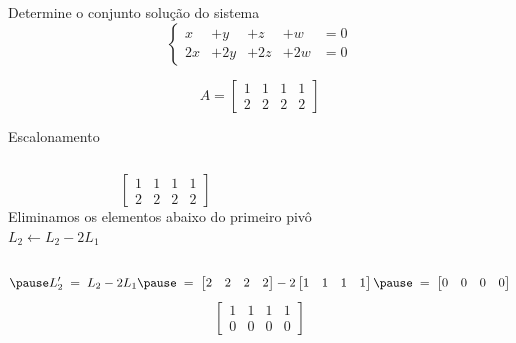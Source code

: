 \begin{question}
  Determine o conjunto solução do sistema
  \[
    \left\{\begin{array}{rrrrr}
       x & +  y & +  z & +  w & = 0 \\
      2x & + 2y & + 2z & + 2w & = 0
    \end{array}\right.
  \]

  \bigskip
  \[
    A =
    \begin{bmatrix}
      1 & 1 & 1 & 1 \\
      2 & 2 & 2 & 2
    \end{bmatrix}
  \]
\end{question}

\begin{resolution}{Escalonamento}
  \begin{columns}
    \[\;\;\;
      \begin{bmatrix}
        1 & 1 & 1 & 1 \\
        2 & 2 & 2 & 2
      \end{bmatrix}
    \]
    \pause
    Eliminamos os elementos abaixo do primeiro pivô
    \\ \pause
    \(
      L_2 \leftarrow L_2 - 2 L_1
    \)
  \end{columns}
  \vspace{-\baselineskip}
  \[
    \pause
    L'_2
    \;=\;
    L_2 - 2 L_1
    \pause
    \;=\;
    \begin{bmatrix}
      2 & 2 & 2 & 2
    \end{bmatrix}
    - 2
    \begin{bmatrix}
      1 & 1 & 1 & 1
    \end{bmatrix}
    \pause
    \;=\;
    \begin{bmatrix}
      0 & 0 & 0 & 0
    \end{bmatrix}
  \]
  \pause
  \[
    \begin{bmatrix}
      1 & 1 & 1 & 1 \\
      0 & 0 & 0 & 0
    \end{bmatrix}
  \]
\end{resolution}


